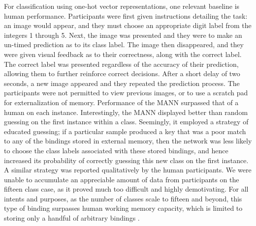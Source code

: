 \documentclass{article}
\begin{document}
For classification using one-hot vector representations, one relevant baseline is human performance. Participants were first given instructions detailing the task: an image would appear, and they must choose an appropriate digit label from the integers 1 through 5. Next, the image was presented and they were to make an un-timed prediction as to its class label. The image then disappeared, and they were given visual feedback as to their correctness, along with the correct label. The correct label was presented regardless of the accuracy of their prediction, allowing them to further reinforce correct decisions. After a short delay of two seconds, a new image appeared and they repeated the prediction process. The participants were not permitted to view previous images, or to use a scratch pad for externalization of memory. Performance of the MANN surpassed that of a human on each instance. Interestingly, the MANN displayed better than random guessing on the first instance within a class. Seemingly, it employed a strategy of educated guessing; if a particular sample produced a key that was a poor match to any of the bindings stored in external memory, then the network was less likely to choose the class labels associated with these stored bindings, and hence increased its probability of correctly guessing this new class on the first instance. A similar strategy was reported qualitatively by the human participants. We were unable to accumulate an appreciable amount of data from participants on the fifteen class case, as it proved much too difficult and highly demotivating. For all intents and purposes, as the number of classes scale to fifteen and beyond, this type of binding surpasses human working memory capacity, which is limited to storing only a handful of arbitrary bindings \cite{cowan2010magical}. 
\end{document}
